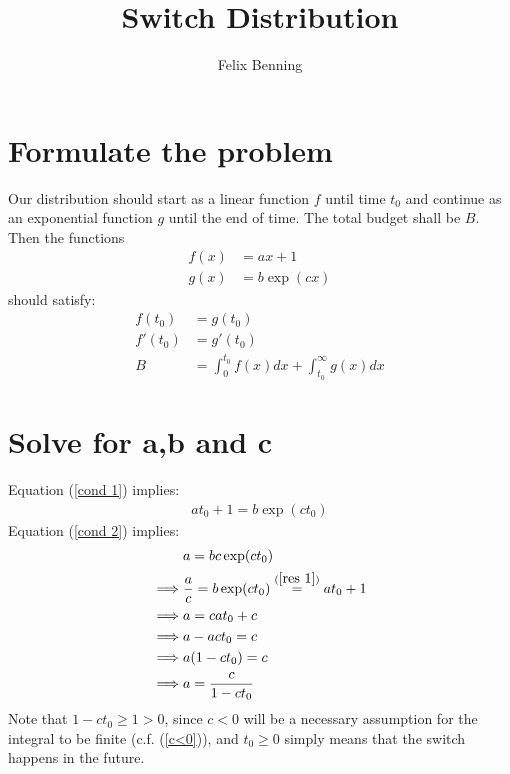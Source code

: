 \documentclass[11pt, a4paper]{article}
\title{Switch Distribution}
\author{Felix Benning}
\begin{document}
    \maketitle

    \section{Formulate the problem}
    Our distribution should start as a linear function \(f\) until time \(t_0\) and continue as an exponential function \(g\) until the end of time. The total budget shall be \(B\). Then the functions
    \begin{align*}
        f(x) & = a x+1\\
        g(x) & = b \exp(cx)
    \end{align*}
    should satisfy:
    \begin{align}
        f(t_0) &= g(t_0) \label{cond 1}\\
        f'(t_0) &= g'(t_0) \label{cond 2}\\
        B &= \int_0^{t_0} f(x) dx + \int_{t_0}^\infty g(x)dx \label{cond 3}
    \end{align}
    \section{Solve for a,b and c}
    Equation (\ref{cond 1}) implies:
    \begin{align}
        at_0 +1 = b \exp(c t_0) \label{res 1}
    \end{align}
    Equation (\ref{cond 2}) implies:
    \begin{align}
        &a = b c \exp(c t_0) \nonumber\\
        \implies & \frac{a}{c} = b \exp(c t_0) \stackrel{(\ref{res 1})}{=} at_0 +1 \label{res 2}\\
        \implies & a = cat_0 + c \nonumber\\
        \implies & a - act_0 = c \nonumber\\
        \implies & a(1-c t_0) =c \nonumber\\
        \implies & a = \frac{c}{1-ct_0} \label{res 3}
    \end{align}
    Note that \(1-ct_0\ge1>0\), since \(c<0\) will be a necessary assumption for the integral to be finite (c.f. (\ref{c<0})), and \(t_0\ge 0\) simply means that the switch happens in the future.
\end{document}
